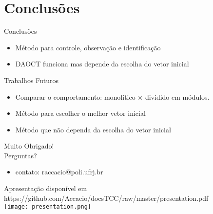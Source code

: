 
\section{Conclusões}

\begin{frame}{Conclusões}
\begin{itemize}\pause
\item Método para controle, observação e identificação\pause 
\item DAOCT funciona mas depende da escolha do vetor inicial\pause 
\end{itemize}
\begin{block}{Trabalhos Futuros}
\begin{itemize}
\item Comparar o comportamento: monolítico $\times$ dividido em módulos. \pause
\item Método para escolher o melhor vetor inicial\pause 
\item Método que não dependa da escolha do vetor inicial
\end{itemize}
\end{block}
\end{frame}

\begin{frame}{}
  \Large{Muito Obrigado!}\\
  \large{\quad Perguntas?}
\begin{center}
\begin{itemize}
\item \small contato: raccacio@poli.ufrj.br
\end{itemize}
\end{center}
\footnotesize{ Apresentação disponível em
  https://github.com/Accacio/docsTCC/raw/master/presentation.pdf}\\
\texttt{[image: presentation.png]}
\end{frame}
